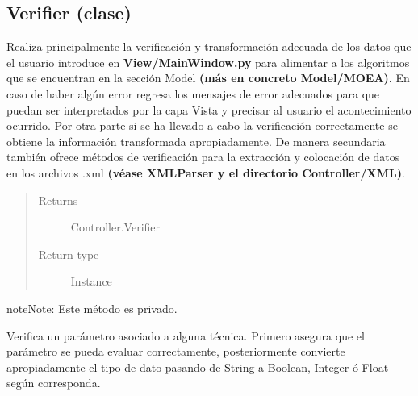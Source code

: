 \documentclass[class=report, crop=false]{standalone}
\begin{document}
\subsection{Verifier (clase)}
\label{sec:a_4_3}
\begin{fulllineitems}

\begin{DUlineblock}{0em}
\item[] Realiza principalmente la verificación y transformación adecuada 
de los datos que el usuario introduce en \textbf{View/MainWindow.py} para 
alimentar a los algoritmos que se encuentran en la sección Model 
\textbf{(más en concreto Model/MOEA)}.\break
En caso de haber algún error regresa los mensajes de error adecuados para 
que puedan ser interpretados por la capa Vista y precisar al usuario el 
acontecimiento ocurrido.\break
Por otra parte si se ha llevado a cabo la verificación correctamente se 
obtiene la información transformada apropiadamente.\medskip\break
De manera secundaria también ofrece métodos de verificación para la 
extracción y colocación de datos en los archivos .xml 
\textbf{(véase XMLParser y el directorio Controller/XML)}.
\end{DUlineblock}

\begin{quote}\begin{description}
\item[{Returns}] \leavevmode
Controller.Verifier
\item[{Return type}] \leavevmode
Instance
\end{description}\end{quote}


\begin{fulllineitems}


\begin{notice}{note}{Note:}
Este método es privado.
\end{notice}

Verifica un parámetro asociado a alguna técnica.
Primero asegura que el parámetro se pueda evaluar correctamente,
posteriormente convierte apropiadamente el tipo de dato pasando 
de String a Boolean, Integer ó Float según corresponda.


\end{fulllineitems}
\end{fulllineitems}
\end{document}
